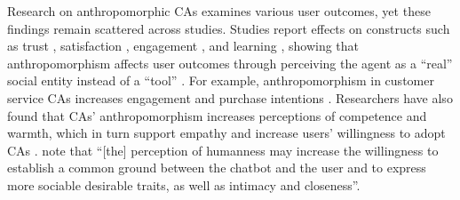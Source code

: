 \documentclass[preprint,review,12pt,authoryear,nonatbib]{elsarticle}
\begin{document}



Research on anthropomorphic CAs examines various user outcomes, yet these findings remain scattered across studies. Studies report effects on constructs such as trust \parencite{nordheim2019trust}, satisfaction \parencite{haugeland_understanding_2022}, engagement \parencite{mehra_chatbot_2021}, and learning \parencite{zheldibayeva_genai_2025}, showing that %
anthropomorphism affects user outcomes %
through perceiving the agent as a ``real'' social entity instead of a ``tool'' \parencite{meyer2023leverage,wang2021seeing}. For example, anthropomorphism in customer service CAs increases engagement and purchase intentions \parencite{depaula2025anthropomorphism,luo2019frontiers}. Researchers have also found that CAs' anthropomorphism increases perceptions of competence and warmth, which in turn support empathy and increase users' willingness to adopt CAs \parencite{kim_what_2024}. \textcite{rapp_human_2021} note that ``[the] perception of humanness may increase the willingness to establish a common ground between the chatbot and the user and to express more sociable desirable traits, as well as intimacy and closeness''.
\end{document}
